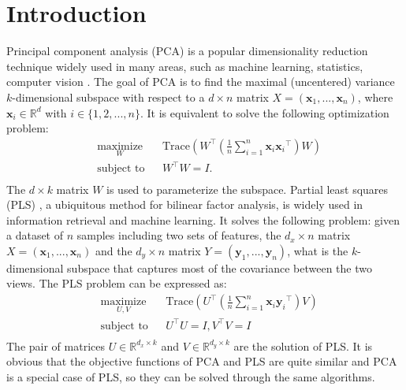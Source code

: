 \documentclass[runningheads,a4paper]{llncs}
\begin{document}
\section{Introduction}
\label{introduction}
Principal component analysis (PCA) is a popular dimensionality reduction technique widely used in many areas, such as machine learning, statistics, computer vision \citep{Stockman2001Computer}. The goal of PCA is to find the maximal (uncentered) variance $k$-dimensional subspace with respect to a $d \times n$ matrix $X = (\mathbf{x}_1, ... , \mathbf{x}_n)$, where $\mathbf{x}_i \in \mathbb{R}^d$ with $i \in \{1,2, ... , n\}$. It is equivalent to solve the following optimization problem:
\begin{equation}
\label{pca-obj}
\begin{aligned}
& \underset{W}{\text{maximize}}
& & \mathrm{Trace}(W^{\top}(\frac{1}{n}\sum\limits_{i=1}^{n}\mathbf{x}_{i}{\mathbf{x}_i}^\top)W) \\
& \text{subject to}
& & W^{\top}W=I. \\
\end{aligned}
\end{equation}
The  $d \times k$ matrix $W$ is used to parameterize the subspace.
Partial least squares (PLS) \citep{Chiang2001Partial}, a ubiquitous method for bilinear factor analysis, is widely used in information retrieval \citep{Salton2003Information} and machine learning. It solves the following problem: given a dataset of $n$ samples including  two sets of features, 
the $d_x \times n$ matrix $X = (\mathbf{x}_1, ... , \mathbf{x}_n)$ and the $d_y \times n$ matrix $Y = (\mathbf{y}_1, ... , \mathbf{y}_n)$, what is the $k$-dimensional subspace that captures most of the covariance between the two views. 
The PLS problem can be expressed as:
\begin{equation}
\label{pls-obj}
\begin{aligned}
& \underset{U,V}{\text{maximize}}
& & \mathrm{Trace}(U^{\top}(\frac{1}{n}\sum\limits_{i=1}^{n}\mathbf{x}_{i}{\mathbf{y}_i}^\top)V) \\
& \text{subject to}
& & U^{\top}U = I, V^{\top}V=I \\
\end{aligned}
\end{equation}
The pair of  matrices $U \in \mathbb{R}^{d_x \times k}$ and $V \in \mathbb{R}^{d_y \times k}$ are the solution of PLS. 
It is obvious that the objective functions of PCA and PLS are quite similar and PCA is a special case of PLS, so they can be solved through the same algorithms.
\end{document}
